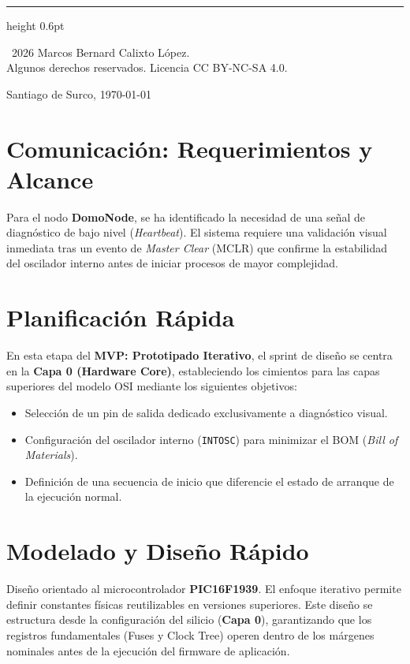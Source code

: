 \documentclass[11pt,a4paper]{article}
\newcommand{\faseactual}{MVP: Prototipado Iterativo}
\begin{document}
\begin{titlepage}
    \vspace{1.5cm}
    
    \hrule height 0.6pt
    \vspace{0.2cm}
    \begin{minipage}[t]{0.65\textwidth}
        {\color{gray}\tiny \textcopyright \ 2026 Marcos Bernard Calixto López. \\ Algunos derechos reservados. Licencia CC BY-NC-SA 4.0.}
    \end{minipage}
    \begin{minipage}[t]{0.34\textwidth}
        \raggedleft
        {\color{gray}\footnotesize Santiago de Surco, \today}
    \end{minipage}
\end{titlepage}

\newpage


\section{Comunicación: Requerimientos y Alcance}
Para el nodo \textbf{DomoNode}, se ha identificado la necesidad de una señal de diagnóstico de bajo nivel (\textit{Heartbeat}). El sistema requiere una validación visual inmediata tras un evento de \textit{Master Clear} (MCLR) que confirme la estabilidad del oscilador interno antes de iniciar procesos de mayor complejidad.

\section{Planificación Rápida}
En esta etapa del \textbf{\faseactual}, el sprint de diseño se centra en la \textbf{Capa 0 (Hardware Core)}, estableciendo los cimientos para las capas superiores del modelo OSI mediante los siguientes objetivos:
\begin{itemize}
    \setlength{\itemsep}{2pt}
    \item Selección de un pin de salida dedicado exclusivamente a diagnóstico visual.
    \item Configuración del oscilador interno (\texttt{INTOSC}) para minimizar el BOM (\textit{Bill of Materials}).
    \item Definición de una secuencia de inicio que diferencie el estado de arranque de la ejecución normal.
\end{itemize}

\section{Modelado y Diseño Rápido}
Diseño orientado al microcontrolador \textbf{PIC16F1939}. El enfoque iterativo permite definir constantes físicas reutilizables en versiones superiores.
Este diseño se estructura desde la configuración del silicio (\textbf{Capa 0}), garantizando que los registros fundamentales (Fuses y Clock Tree) operen dentro de los márgenes nominales antes de la ejecución del firmware de aplicación.
\end{document}
